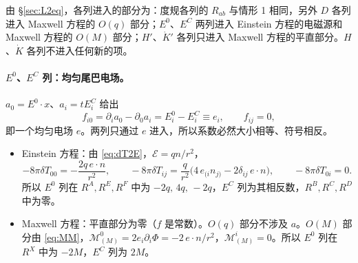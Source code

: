 \documentclass[11pt,a4paper]{ctexart}
\numberwithin{equation}{section}
\begin{document}
由 \S\ref{sec:L2eq}，各列进入的部分为：度规各列的 $R_{ab}$ 与情形 1 相同，另外 $D$ 各列进入 Maxwell 方程的 $O(q)$ 部分；$E^0$、$E^C$ 两列进入 Einstein 方程的电磁源和 Maxwell 方程的 $O(M)$ 部分；$H'$、$\dot K'$ 各列只进入 Maxwell 方程的平直部分。$H$、$\dot K$ 各列不进入任何新的项。

\paragraph{$E^0$、$E^C$ 列：均匀尾巴电场。}$a_0=E^0\!\cdot x$、$a_i=tE^C_i$ 给出
\begin{equation}
f_{i0}=\partial_ia_0-\partial_0a_i=E^0_i-E^C_i\equiv e_i,\qquad f_{ij}=0 ,
\end{equation}
即一个均匀电场 $e$。两列只通过 $e$ 进入，所以系数必然大小相等、符号相反。
\begin{itemize}
\item Einstein 方程：由 \eqref{eq:dT2E}，$\mathcal E=qn/r^2$，
\begin{equation*}
-8\pi\delta T_{00}=-\frac{2q\,e\!\cdot n}{r^2},\qquad
-8\pi\delta T_{ij}=\frac{q}{r^2}\big(4\,e_{(i}n_{j)}-2\delta_{ij}\,e\!\cdot n\big),\qquad -8\pi\delta T_{0i}=0 .
\end{equation*}
所以 $E^0$ 列在 $R^A,R^E,R^F$ 中为 $-2q,\,4q,\,-2q$，$E^C$ 列为其相反数，$R^B,R^C,R^D$ 中为零。
\item Maxwell 方程：平直部分为零（$f$ 是常数）。$O(q)$ 部分不涉及 $a$。$O(M)$ 部分由 \eqref{eq:MM}，$\mathcal M^0_{(M)}=2e_i\partial_i\Phi=-2\,e\!\cdot n/r^2$，$\mathcal M^i_{(M)}=0$。所以 $E^0$ 列在 $R^X$ 中为 $-2M$，$E^C$ 列为 $2M$。
\end{itemize}
\end{document}
